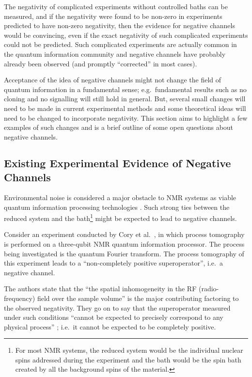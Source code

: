 The negativity of complicated experiments without controlled baths can be measured, and if the negativity were found to be non-zero in experiments predicted to have non-zero negativity, then the evidence for negative channels would be convincing, even if the exact negativity of such complicated experiments could not be predicted.  Such complicated experiments are actually common in the quantum information community and negative channels have probably already been observed (and promptly ``corrected'' in most cases).

Acceptance of the idea of negative channels might not change the field of quantum information in a fundamental sense; e.g.\ fundamental results such as no cloning and no signalling will still hold in general.  But, several small changes will need to be made in current experimental methods and some theoretical ideas will need to be changed to incorporate negativity.  This section aims to highlight a few examples of such changes and is a brief outline of some open questions about negative channels.

\subsection{Existing Experimental Evidence of Negative Channels}
\label{sec:Havel}

Environmental noise is considered a major obstacle to NMR systems as viable quantum information processing technologies \cite{Boulant2004}.  Such strong ties between the reduced system and the bath\footnote{For most NMR systems, the reduced system would be the individual nuclear spins addressed during the experiment and the bath would be the spin bath created by all the background spins of the material.} might be expected to lead to negative channels.

Consider an experiment conducted by Cory et al.\ \cite{Cory2004}, in which process tomography is performed on a three-qubit NMR quantum information processor.  The process being investigated is the quantum Fourier transform.  The process tomography of this experiment leads to a ``non-completely positive superoperator'', i.e.\ a negative channel.  

The authors state that the ``the spatial inhomogeneity in the RF (radio-frequency) field over the sample volume'' \cite{Cory2004} is the major contributing factoring to the observed negativity.  They go on to say that the superoperator measured under such conditions ``cannot be expected to precisely correspond to any physical process'' \cite{Cory2004}; i.e.\ it cannot be expected to be completely positive.    

